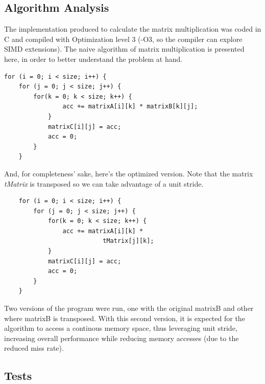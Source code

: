 \documentclass[a4paper,10pt,openright,openbib,twocolumn]{article}
\begin{document}
\subsection{Algorithm Analysis}
The implementation produced to calculate the matrix multiplication was coded in C and compiled with Optimization level 3 (-O3, so the compiler can explore SIMD extensions).
The naive algorithm of matrix multiplication is presented here, in order to better understand the problem at hand.
\small
\begin{verbatim}
for (i = 0; i < size; i++) {
    for (j = 0; j < size; j++) {
        for(k = 0; k < size; k++) {
                acc += matrixA[i][k] * matrixB[k][j];				
            }		
            matrixC[i][j] = acc;	
            acc = 0;
        }
    }
\end{verbatim}

And, for completeness' sake, here's the optimized version. Note that the matrix \emph{tMatrix} is transposed so we can take advantage of a unit stride. 
\small
\begin{verbatim}
    for (i = 0; i < size; i++) {
        for (j = 0; j < size; j++) {
            for(k = 0; k < size; k++) {
                acc += matrixA[i][k] * 
                           tMatrix[j][k];				
            }		
            matrixC[i][j] = acc;	
            acc = 0;
        }
    }		
\end{verbatim}

Two versions of the program were run, one with the original matrixB and other where matrixB is transposed. With this second version, it is expected for the algorithm to access a continous memory space, thus leveraging unit stride, increasing overall performance while reducing memory accesses (due to the reduced miss rate).

\subsection{Tests}
\end{document}
